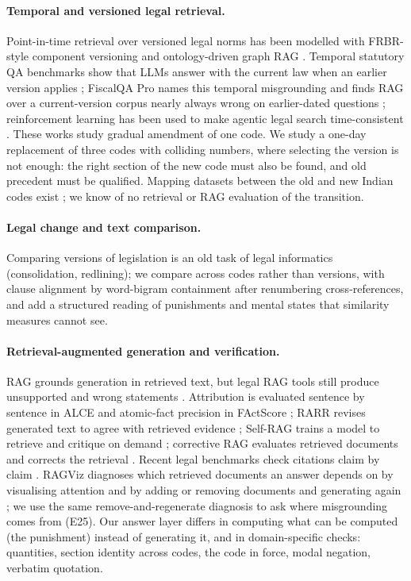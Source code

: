 \documentclass[sigconf,nonacm]{acmart}
\begin{document}
\paragraph{Temporal and versioned legal retrieval.} Point-in-time retrieval over versioned legal
norms has been modelled with FRBR-style component versioning \cite{frbr} and ontology-driven graph
RAG \cite{satgraph}. Temporal statutory QA benchmarks show that LLMs answer with the current law
when an earlier version applies \cite{oldfriend}; FiscalQA Pro names this temporal misgrounding and
finds RAG over a current-version corpus nearly always wrong on earlier-dated questions
\cite{fiscalqa}; reinforcement learning has been used to make agentic legal search time-consistent
\cite{timetravel}. These works study gradual amendment of one code. We study a one-day replacement
of three codes with colliding numbers, where selecting the version is not enough: the right section
of the new code must also be found, and old precedent must be qualified. Mapping datasets between
the old and new Indian codes exist \cite{ieeemapping}; we know of no retrieval or RAG evaluation of
the transition.

\paragraph{Legal change and text comparison.} Comparing versions of legislation is an old task of
legal informatics (consolidation, redlining); we compare across codes rather than versions, with
clause alignment by word-bigram containment \cite{broder1997} after renumbering cross-references, and
add a structured reading of punishments and mental states that similarity measures cannot see.

\paragraph{Retrieval-augmented generation and verification.} RAG grounds generation in retrieved
text, but legal RAG tools still produce unsupported and wrong statements \cite{magesh2025}.
Attribution is evaluated sentence by sentence in ALCE \cite{alce} and atomic-fact precision in
FActScore \cite{factscore}; RARR revises generated text to agree with retrieved evidence
\cite{rarr}; Self-RAG trains a model to retrieve and critique on demand \cite{selfrag}; corrective
RAG evaluates retrieved documents and corrects the retrieval \cite{crag}. Recent legal benchmarks
check citations claim by claim \cite{lephantomcite,parcel}. RAGViz diagnoses which retrieved
documents an answer depends on by visualising attention and by adding or removing documents and
generating again \cite{ragviz}; we use the same remove-and-regenerate diagnosis to ask where
misgrounding comes from (E25). Our answer layer differs in computing
what can be computed (the punishment) instead of generating it, and in domain-specific checks:
quantities, section identity across codes, the code in force, modal negation, verbatim quotation.
\end{document}
